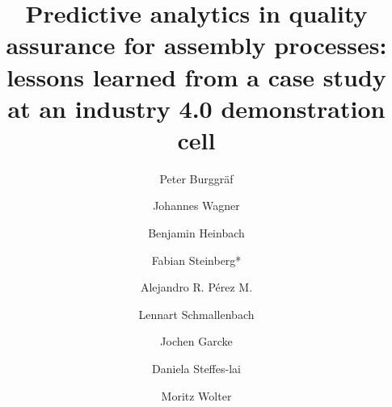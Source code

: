 \documentclass[5p,times,procedia]{elsarticle}
\begin{document}
\begin{frontmatter}



%

\title{Predictive analytics in quality assurance for assembly processes:
       lessons learned from a case study at an industry 4.0 demonstration cell}




\author[a]{Peter Burggräf}
\author[a]{Johannes Wagner}
\author[a]{Benjamin Heinbach}
\author[a]{Fabian Steinberg*} 
\author[a]{Alejandro R. Pérez M.}
\author[a]{Lennart Schmallenbach}
\author[b,c,d]{Jochen Garcke}
\author[b]{Daniela Steffes-lai}
\author[b,c,e]{Moritz Wolter}


\address[a]{Chair of International Production Engineering and Management (IPEM), Universität Siegen, Paul-Bonatz-Straße 9-11, 57076 Siegen, Germany}
\address[b]{Fraunhofer Institute for Algorithms and Scientific Computing (SCAI), Schloss Birlinghoven 1, 53757 Sankt Augustin, Germany}
\address[c]{Fraunhofer Center for Machine Learning, Schloss Birlinghoven 1, 53757 Sankt Augustin, Germany}
\address[d]{Institute for Numerical Simulation, Universität Bonn, Endenicher Allee 19b, 53115 Bonn, Germany}
\address[e]{Institute for Computer Science, Universität Bonn, Endenicher Allee 19a, 53115 Bonn, Germany}



\end{frontmatter}
\end{document}
